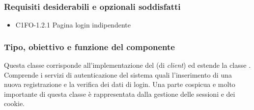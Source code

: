 \subsubsection*{Requisiti desiderabili e opzionali soddisfatti}
\begin{itemize}
    \item C1FO-1.2.1 Pagina login indipendente
\end{itemize}
\subsubsection*{Tipo, obiettivo e funzione del componente}
Questa classe corrisponde all'implementazione del  (di
\emph{client}) ed estende la classe . Comprende i
servizi di autenticazione del sistema quali l'inserimento di una nuova
registrazione e la verifica dei dati di login. Una parte cospicua e molto
importante di questa classe \`e rappresentata dalla gestione delle sessioni e
dei cookie.
